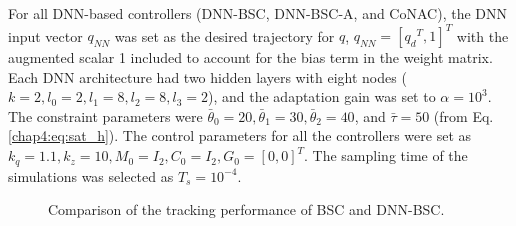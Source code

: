 For all DNN-based controllers (DNN-BSC, DNN-BSC-A, and CoNAC), the DNN input vector $q_{NN}$ was set as the desired trajectory for ${q}$, \ie $q_{NN}=[{q_d}^T,1]^T$ with the augmented scalar 1 included to account for the bias term in the weight matrix. 
Each DNN architecture had two hidden layers with eight nodes (\ie $k=2, l_0=2, l_1=8, l_2=8, l_3=2$), and the adaptation gain was set to $\alpha =10^3$. 
The constraint parameters were $\bar\theta_0=20, \bar\theta_1=30, \bar\theta_2=40$, and $\bar\tau = 50$ (from Eq. \eqref{chap4:eq:sat_h}). 
The control parameters for all the controllers were set as ${k_q}=1.1,{k_z}=10,M_0=I_2,C_0=I_2,G_0=[0,0]^T$.
The sampling time of the simulations was selected as $T_s=10^{-4}$.


\begin{figure}[!t]
    \centering
    \vfill
    \caption{Comparison of the tracking performance of BSC and DNN-BSC.}
    \label{chap4:fig:tracking1}
\end{figure}

